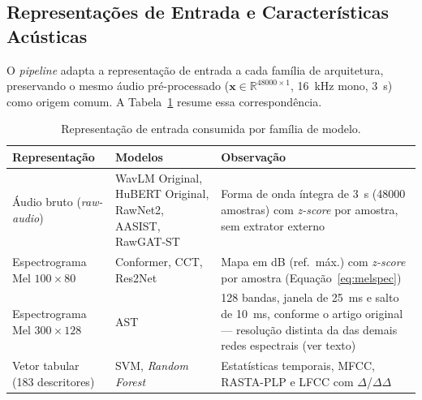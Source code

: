 \documentclass[12pt,a4paper]{article}
\begin{document}
\newpage

\subsection{Representações de Entrada e Características Acústicas}
\label{sec:caracteristicas}

O \textit{pipeline} adapta a representação de entrada a cada família de
arquitetura, preservando o mesmo áudio pré-processado
($\mathbf{x} \in \mathbb{R}^{48000\times1}$, \SI{16}{\kilo\hertz} mono,
\SI{3}{\second}) como origem comum. A Tabela~\ref{tab:representacoes_entrada}
resume essa correspondência.

\begin{table}[H]
	\centering
	\caption{Representação de entrada consumida por família de modelo.}
	\label{tab:representacoes_entrada}
	\small
	\begin{tabular}{@{}>{\raggedright\arraybackslash}p{3.2cm}
			>{\raggedright\arraybackslash}p{4.6cm}
			>{\raggedright\arraybackslash}p{6.2cm}@{}}
		\toprule
		\textbf{Representação} & \textbf{Modelos} & \textbf{Observação} \\
		\midrule
		Áudio bruto (\textit{raw-audio}) & WavLM Original, HuBERT Original, RawNet2,
		AASIST, RawGAT-ST &
		Forma de onda íntegra de \SI{3}{\second} (\num{48000} amostras) com
		\textit{z-score} por amostra, sem extrator externo \\
		\addlinespace
		Espectrograma Mel $100 \times 80$ & Conformer, CCT, Res2Net &
		Mapa em dB (ref.\ máx.) com \textit{z-score} por amostra
		(Equação~\ref{eq:melspec}) \\
		\addlinespace
		Espectrograma Mel $300 \times 128$ & AST &
		\num{128} bandas, janela de \SI{25}{\milli\second} e salto de
		\SI{10}{\milli\second}, conforme o artigo original --- resolução distinta da
		das demais redes espectrais (ver texto) \\
		\addlinespace
		Vetor tabular (\num{183} descritores) & SVM, \textit{Random Forest} &
		Estatísticas temporais, MFCC, RASTA-PLP e LFCC com $\Delta$/$\Delta\Delta$ \\
		\bottomrule
	\end{tabular}
\end{table}
\end{document}
